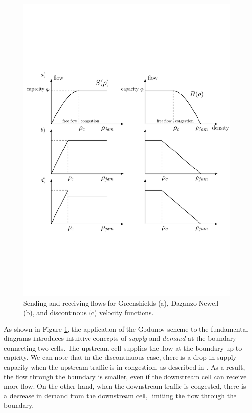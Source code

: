 \documentclass[11pt]{article}
\numberwithin{equation}{section}
\numberwithin{figure}{section}
\numberwithin{table}{section}
\begin{document}
\begin{figure}[ht]
  \centering
    \includegraphics[width=12cm]{fundamentalDiagramSR.pdf}
    \caption{Sending and receiving flows for Greenshields (a), Daganzo-Newell (b), and discontinous (c) velocity functions.}
    \label{fig:fundamentalDiagramSR}
\end{figure}

\noindent As shown in Figure \ref{fig:fundamentalDiagramSR}, the application of the Godunov scheme to the fundamental diagrams introduces intuitive concepts of \textit{supply} and \textit{demand} at the boundary connecting two cells. The upstream cell supplies the flow at the boundary up to capicity. We can note that in the discontinuous case, there is a drop in supply capacity when the upstream traffic is in congestion, as described in \cite{Agyemang-Duah1991,Cassidy1999,Hall1991}. As a result, the flow through the boundary is smaller, even if the downstream cell can receive more flow. On the other hand, when the downstream traffic is congested, there is a decrease in demand from the downstream cell, limiting the flow through the boundary.
\end{document}
